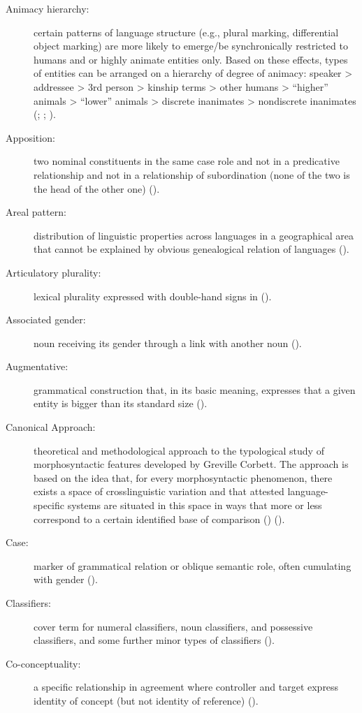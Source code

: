 \documentclass[output=collectionpaper]{langsci/langscibook}
\begin{document}
{\begin{description}
\item  [Animacy hierarchy:] certain patterns of language structure (e.g., plural marking, differential object marking) are more likely to emerge/be synchronically restricted to humans and or highly animate entities only. Based on these effects, types of entities can be arranged on a hierarchy of degree of animacy: speaker > addressee > 3rd person > kinship terms > other humans > “higher” animals > “lower” animals > discrete inanimates > nondiscrete inanimates (\citealt{Smith-Stark1974}; \citealt{Corbett2000}; \citealt{Haspelmath2013}).
\item  [Apposition:] two nominal constituents in the same case role and not in a predicative relationship and not in a relationship of subordination (none of the two is the head of the other one) ().
\item  [Areal pattern:] distribution of linguistic properties across languages in a geographical area that cannot be explained by obvious genealogical relation of languages ().
\item  [Articulatory plurality:] lexical plurality expressed with double-hand signs in  ().
\item  [Associated gender:] noun receiving its gender through a link with another noun ().
\item  [Augmentative:] grammatical construction that, in its basic meaning, expresses that a given entity is bigger than its standard size ().
\item  [Canonical Approach:] theoretical and methodological approach to the typological study of morphosyntactic features developed by Greville Corbett. The approach is based on the idea that, for every morphosyntactic phenomenon, there exists a space of crosslinguistic variation and that attested language-specific systems are situated in this space in ways that more or less correspond to a certain identified base of comparison (\citealt[2]{Audring2018}) ().
\item  [Case:] marker of grammatical relation or oblique semantic role, often cumulating with gender ().
\item  [Classifiers:] cover term for numeral classifiers, noun classifiers, and possessive classifiers, and some further minor types of classifiers ().
\item  [Co-conceptuality:] a specific relationship in agreement where controller and target express identity of concept (but not identity of reference) ().

\end{description}}
\end{document}
